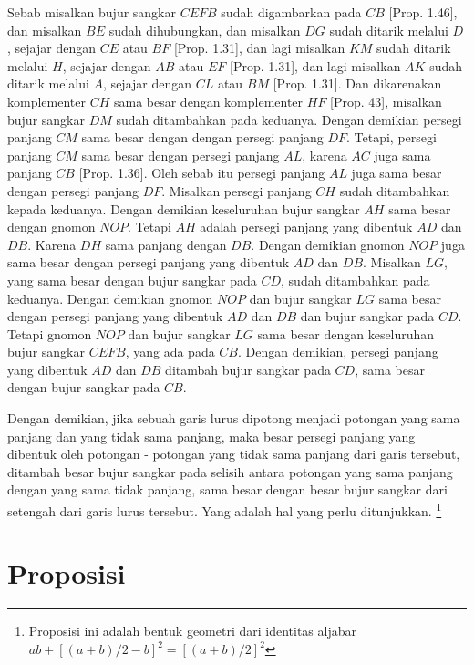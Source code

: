 \documentclass[a4paper]{book}
\begin{document}
Sebab misalkan bujur sangkar $CEFB$ sudah digambarkan pada $CB$ [Prop. 1.46], 
dan misalkan $BE$ sudah dihubungkan, dan misalkan $DG$ sudah ditarik melalui 
$D$, sejajar dengan $CE$ atau $BF$ [Prop. 1.31], dan lagi misalkan $KM$ sudah 
ditarik melalui $H$, sejajar dengan $AB$ atau $EF$ [Prop. 1.31], dan lagi
misalkan $AK$ sudah ditarik melalui $A$, sejajar dengan $CL$ atau $BM$ 
[Prop. 1.31].
Dan dikarenakan komplementer $CH$ sama besar dengan komplementer $HF$ 
[Prop. 43], 
misalkan
bujur sangkar $DM$ sudah ditambahkan pada keduanya. Dengan demikian persegi 
panjang
$CM$ sama besar dengan dengan persegi panjang $DF$. Tetapi, persegi panjang 
$CM$ 
sama besar dengan persegi panjang $AL$, karena $AC$ juga sama panjang $CB$ 
[Prop. 1.36].  Oleh sebab itu persegi panjang $AL$  juga sama besar dengan 
persegi panjang $DF$.
Misalkan persegi panjang $CH$ sudah ditambahkan kepada keduanya. Dengan 
demikian keseluruhan bujur sangkar $AH$ sama besar dengan gnomon $NOP$. 
Tetapi $AH$ adalah persegi panjang yang dibentuk $AD$ dan $DB$. Karena $DH$
sama panjang dengan $DB$. Dengan demikian gnomon $NOP$ juga sama besar dengan 
persegi panjang yang dibentuk $AD$ dan $DB$. Misalkan $LG$, yang sama besar
dengan bujur sangkar pada $CD$, sudah ditambahkan pada keduanya. Dengan 
demikian gnomon $NOP$ dan bujur sangkar $LG$ sama besar dengan persegi panjang
yang dibentuk $AD$ dan $DB$ dan bujur sangkar pada $CD$. Tetapi gnomon $NOP$
dan bujur sangkar $LG$ sama besar dengan keseluruhan bujur sangkar $CEFB$, yang
ada pada $CB$. Dengan demikian, persegi panjang yang dibentuk $AD$ dan $DB$
ditambah bujur sangkar pada $CD$, sama besar dengan bujur sangkar pada $CB$.

Dengan demikian, jika sebuah garis lurus dipotong menjadi potongan yang sama 
panjang dan yang tidak sama panjang, maka besar persegi panjang yang dibentuk oleh 
potongan - potongan yang tidak sama panjang dari garis tersebut, 
ditambah besar bujur sangkar pada selisih antara potongan yang sama panjang dengan 
yang sama tidak panjang, sama besar dengan besar bujur sangkar dari setengah dari 
garis lurus tersebut. Yang adalah hal yang perlu ditunjukkan.
\footnote{Proposisi ini adalah bentuk
geometri dari identitas aljabar $ab + [(a+b)/2-b]^2 = [(a+b)/2]^2$ }

\section*{\centering Proposisi \thesection} 
\end{document}
